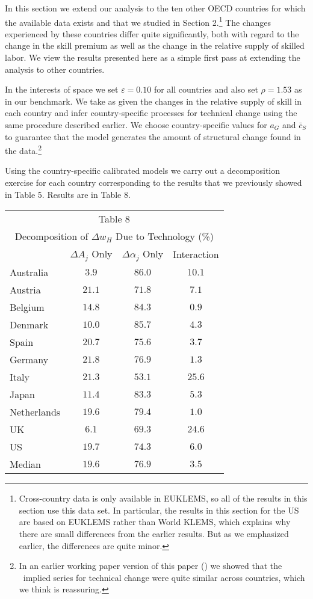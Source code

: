 \documentclass[12pt,english]{article}
\begin{document}
{\normalsize In this section we extend our analysis to the ten other OECD
countries for which the available data exists and that we studied in Section
2.\footnote{%
Cross-country data is only available in EUKLEMS, so all of the results in
this section use this data set. In particular, the results in this section
for the US are based on EUKLEMS rather than World KLEMS, which explains why
there are small differences from the earlier results. But as we emphasized
earlier, the differences are quite minor.} The changes experienced by these
countries differ quite significantly, both with regard to the change in the
skill premium as well as the change in the relative supply of skilled labor.
We view the results presented here as a simple first pass at extending the
analysis to other countries. }

{\normalsize In the interests of space we set $\varepsilon =0.10$ for all
countries and also set $\rho =1.53$ as in our benchmark. We take as given
the changes in the relative supply of skill in each country and infer
country-specific processes for technical change using the same procedure
described earlier. We choose country-specific values for $a_{G}$ and $\bar{c}%
_{S}$ to guarantee that the model generates the amount of structural change
found in the data.\footnote{%
In an earlier working paper version of this paper (\citet{BueKabRog15}) we
showed that the \ implied series for technical change were quite similar
across countries, which we think is reassuring.} }

{\normalsize Using the country-specific calibrated models we carry out a
decomposition exercise for each country corresponding to the results that we
previously showed in Table 5. Results are in Table 8. }

\begin{center}
{\normalsize {\small 
\begin{tabular}{lccc}
\multicolumn{4}{c}{Table 8} \\ 
\multicolumn{4}{c}{Decomposition of $\Delta w_{H}$ Due to Technology (\%)}
\\ \hline
\  & $\Delta A_{j}$ Only & $\Delta \alpha _{j}$ Only & Interaction \\ \hline
Australia & $3.9$ & $86.0$ & $10.1$ \\ 
Austria & $21.1$ & $71.8$ & $7.1$ \\ 
Belgium & $14.8$ & $84.3$ & $0.9$ \\ 
Denmark & $10.0$ & $85.7$ & $4.3$ \\ 
Spain & $20.7$ & $75.6$ & $3.7$ \\ 
Germany & $21.8$ & $76.9$ & $1.3$ \\ 
Italy & $21.3$ & $53.1$ & $25.6$ \\ 
Japan & $11.4$ & $83.3$ & $5.3$ \\ 
Netherlands & $19.6$ & $79.4$ & $1.0$ \\ 
UK & $6.1$ & $69.3$ & $24.6$ \\ 
US & $19.7$ & $74.3$ & $6.0$ \\ \hline
Median & $19.6$ & $76.9$ & $3.5$ \\ \hline
\end{tabular}
} }
\end{center}
\end{document}

